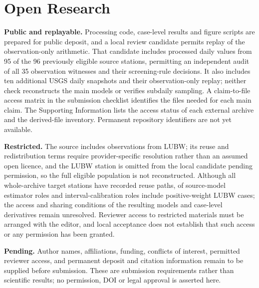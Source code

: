 \documentclass[draft,linenumbers]{agujournal2025}
\begin{document}
\section*{Open Research}
\textbf{Public and replayable.} Processing code, case-level results and figure scripts are prepared for public deposit, and a local review candidate permits replay of the observation-only arithmetic. That candidate includes processed daily values from 95 of the 96 previously eligible source stations, permitting an independent audit of all 35 observation witnesses and their screening-rule decisions. It also includes ten additional USGS daily snapshots and their observation-only replay; neither check reconstructs the main models or verifies subdaily sampling. A claim-to-file access matrix in the submission checklist identifies the files needed for each main claim. The Supporting Information lists the access status of each external archive and the derived-file inventory. Permanent repository identifiers are not yet available.

\textbf{Restricted.} The source includes observations from LUBW; its reuse and redistribution terms require provider-specific resolution rather than an assumed open licence, and the LUBW station is omitted from the local candidate pending permission, so the full eligible population is not reconstructed. Although all whole-archive target stations have recorded reuse paths, \RightsEstimatorLUBW{} of \RightsModelCombinations{} source-model estimator roles and \RightsCalibrationLUBW{} interval-calibration roles include positive-weight LUBW cases; the access and sharing conditions of the resulting models and case-level derivatives remain unresolved. Reviewer access to restricted materials must be arranged with the editor, and local acceptance does not establish that such access or any permission has been granted.

\textbf{Pending.} Author names, affiliations, funding, conflicts of interest, permitted reviewer access, and permanent deposit and citation information remain to be supplied before submission. These are submission requirements rather than scientific results; no permission, DOI or legal approval is asserted here.




\end{document}
